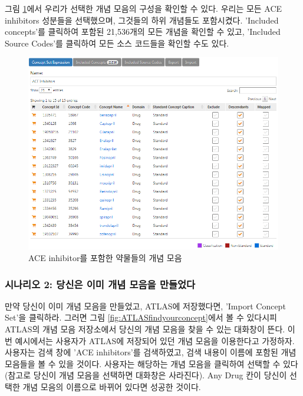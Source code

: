 \documentclass[11pt]{book}
\theoremstyle{definition}
\theoremstyle{definition}
\theoremstyle{definition}
\theoremstyle{remark}
\begin{document}
그림 \ref{fig:aceConceptSetExpression}에서 우리가 선택한 개념 모음의
구성을 확인할 수 있다. 우리는 모든 ACE inhibitors 성분들을 선택했으며,
그것들의 하위 개념들도 포함시켰다. 'Included concepts'를 클릭하여 포함된
21,536개의 모든 개념을 확인할 수 있고, 'Included Source Codes'를
클릭하여 모든 소스 코드들을 확인할 수도 있다.

\begin{figure}

{\centering \includegraphics[width=1\linewidth]{images/Cohorts/aceConceptSetExpression} 

}

\caption{ACE inhibitor를 포함한 약물들의 개념 모음}\label{fig:aceConceptSetExpression}
\end{figure}

\subsubsection*{시나리오 2: 당신은 이미 개념 모음을
만들었다}\label{-2-----}

만약 당신이 이미 개념 모음을 만들었고, ATLAS에 저장했다면, 'Import
Concept Set'을 클릭하라. 그러면 그림 \ref{fig:ATLASfindyourconcept}에서
볼 수 있다시피 ATLAS의 개념 모음 저장소에서 당신의 개념 모음을 찾을 수
있는 대화창이 뜬다. 이번 예시에서는 사용자가 ATLAS에 저장되어 있던 개념
모음을 이용한다고 가정하자. 사용자는 검색 창에 'ACE inhibitors'를
검색하였고, 검색 내용이 이름에 포함된 개념 모음들을 볼 수 있을 것이다.
사용자는 해당하는 개념 모음을 클릭하여 선택할 수 있다 (참고로 당신이
개념 모음을 선택하면 대화창은 사라진다). Any Drug 칸이 당신이 선택한
개념 모음의 이름으로 바뀌어 있다면 성공한 것이다.
\end{document}
